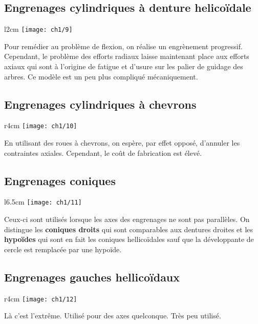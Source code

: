 \subsection{Engrenages cylindriques à denture helicoïdale}
	\begin{wrapfigure}[5]{l}{2cm}
	\vspace{-5mm}
	\texttt{[image: ch1/9]}
	\end{wrapfigure}	
	\noindent Pour remédier au problème de flexion, on réalise un engrènement progressif. Cependant, le problème des efforts radiaux laisse maintenant place aux efforts axiaux qui sont à l'origine de fatigue et d'usure sur les palier de guidage des arbres. Ce modèle est un peu plus compliqué mécaniquement. \\
	
\subsection{Engrenages cylindriques à chevrons}
	\begin{wrapfigure}[4]{r}{4cm}
	\vspace{-5mm}
	\texttt{[image: ch1/10]}
	\end{wrapfigure}	
	\noindent En utilisant des roues à chevrons, on espère, par effet opposé, d'annuler les contraintes axiales. Cependant, le coût de fabrication est élevé. \\
	
\subsection{Engrenages coniques}
	\begin{wrapfigure}[6]{l}{6.5cm}
	\vspace{-5mm}
	\texttt{[image: ch1/11]}
	\end{wrapfigure}	
	\noindent Ceux-ci sont utilisés lorsque les axes des engrenages ne sont pas parallèles. On distingue les \textbf{coniques droits} qui sont comparables aux dentures droites et les \textbf{hypoïdes} qui sont en fait les coniques hellicoïdales sauf que la développante de cercle est remplacée par une hypoïde.
	
\subsection{Engrenages gauches hellicoïdaux}
	\begin{wrapfigure}[2]{r}{4cm}
	\vspace{-5mm}
	\texttt{[image: ch1/12]}
	\end{wrapfigure}	
	\noindent Là c'est l'extrême. Utilisé pour des axes quelconque. Très peu utilisé. \\\\\\\\

